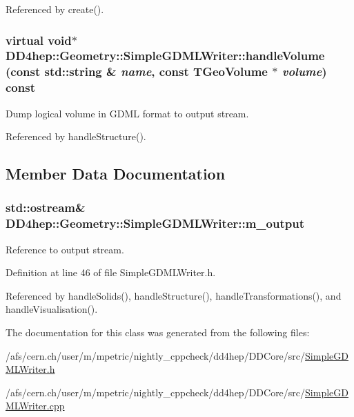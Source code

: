 Referenced by create().\hypertarget{class_d_d4hep_1_1_geometry_1_1_simple_g_d_m_l_writer_a1ff1d6d4cb53ee0e3990e10b54fa4983}{
\subsubsection[{handleVolume}]{\setlength{\rightskip}{0pt plus 5cm}virtual void$\ast$ DD4hep::Geometry::SimpleGDMLWriter::handleVolume (const std::string \& {\em name}, \/  const TGeoVolume $\ast$ {\em volume}) const}}
\label{class_d_d4hep_1_1_geometry_1_1_simple_g_d_m_l_writer_a1ff1d6d4cb53ee0e3990e10b54fa4983}


Dump logical volume in GDML format to output stream. 

Referenced by handleStructure().

\subsection{Member Data Documentation}
\hypertarget{class_d_d4hep_1_1_geometry_1_1_simple_g_d_m_l_writer_acfe610e807da01fe85b3e2bf5f94f428}{
\subsubsection[{m\_\-output}]{\setlength{\rightskip}{0pt plus 5cm}std::ostream\& {\bf DD4hep::Geometry::SimpleGDMLWriter::m\_\-output}}}
\label{class_d_d4hep_1_1_geometry_1_1_simple_g_d_m_l_writer_acfe610e807da01fe85b3e2bf5f94f428}


Reference to output stream. 

Definition at line 46 of file SimpleGDMLWriter.h.

Referenced by handleSolids(), handleStructure(), handleTransformations(), and handleVisualisation().

The documentation for this class was generated from the following files:\begin{DoxyCompactItemize}
\item 
/afs/cern.ch/user/m/mpetric/nightly\_\-cppcheck/dd4hep/DDCore/src/\hyperlink{_simple_g_d_m_l_writer_8h}{SimpleGDMLWriter.h}\item 
/afs/cern.ch/user/m/mpetric/nightly\_\-cppcheck/dd4hep/DDCore/src/\hyperlink{_simple_g_d_m_l_writer_8cpp}{SimpleGDMLWriter.cpp}\end{DoxyCompactItemize}
